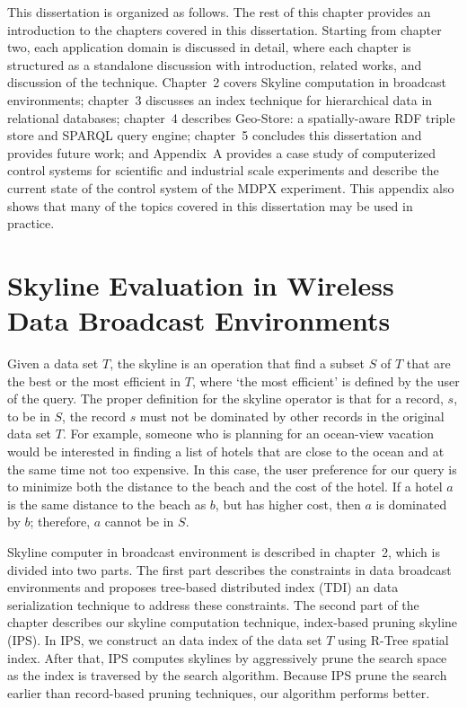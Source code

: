 This dissertation is organized as follows. The rest of this chapter provides an introduction to the chapters covered in this dissertation. Starting from chapter two, each application domain is discussed in detail, where each chapter is structured as a standalone discussion with introduction, related works, and discussion of the technique. Chapter~2 covers Skyline computation in broadcast environments; chapter~3 discusses an index technique for hierarchical data in relational databases; chapter~4 describes Geo-Store: a spatially-aware RDF triple store and SPARQL query engine; chapter~5 concludes this dissertation and provides future work; and Appendix~A provides a case study of computerized control systems for scientific and industrial scale experiments and describe the current state of the control system of the MDPX experiment. This appendix also shows that many of the topics covered in this dissertation may be used in practice.

\section{Skyline Evaluation in Wireless Data Broadcast Environments}

Given a data set $T$, the skyline is an operation that find a subset $S$ of $T$ that are the best or the most efficient in $T$, where `the most efficient' is defined by the user of the query. The proper definition for the skyline operator is that for a record, $s$, to be in $S$, the record $s$ must not be dominated by other records in the original data set $T$\cite{shooting_stars, progressive_skyline}. For example, someone who is planning for an ocean-view vacation would be interested in finding a list of hotels that are close to the ocean and at the same time not too expensive. In this case, the user preference for our query is to minimize both the distance to the beach and the cost of the hotel. If a hotel $a$ is the same distance to the beach as $b$, but has higher cost, then $a$ is dominated by $b$; therefore, $a$ cannot be in $S$.

Skyline computer in broadcast environment is described in chapter~2, which is divided into two parts. The first part describes the constraints in data broadcast environments and proposes tree-based distributed index (TDI) an data serialization technique to address these constraints. The second part of the chapter describes our skyline computation technique, index-based pruning skyline (IPS). In IPS, we construct an data index of the data set $T$ using R-Tree spatial index. After that, IPS computes skylines by aggressively prune the search space as the index is traversed by the search algorithm. Because IPS prune the search earlier than record-based pruning techniques, our algorithm performs better.

